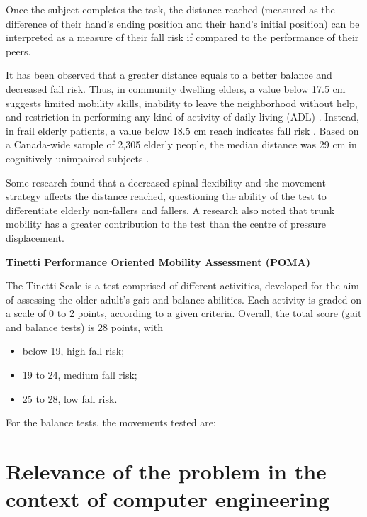 Once the subject completes the task, the distance reached (measured as the difference of their hand's ending position and their hand's initial position) can be interpreted as a measure of their fall risk if compared to the performance of their peers. 

It has been observed that a greater distance equals to a better balance and decreased fall risk. Thus, in community dwelling elders, a value below 17.5 cm suggests limited mobility skills,
inability to leave the neighborhood without help, and restriction in performing any kind of activity of daily living (ADL) \cite{FRTadl}. Instead, in frail elderly patients, a value below 18.5 cm reach indicates fall risk \cite{FRTfallrisk}. Based on a Canada-wide sample of 2,305 elderly people, the median distance was 29 cm in cognitively unimpaired subjects \cite{FRTnonfrail}.

Some research \cite{FRTreasearch1}  \cite{FRTreasearch2} found that a decreased spinal flexibility and the movement strategy affects the distance reached, questioning the ability of the test to differentiate elderly non-fallers and fallers. A research \cite{FRTtruckmobility} also noted that trunk mobility has a greater contribution to the test than the centre of pressure displacement. 

\vspace{0.3cm}
\textbf{Tinetti Performance Oriented Mobility Assessment (POMA)}

The Tinetti Scale is a test comprised of different activities, developed for the aim of assessing the older adult’s gait and 
balance abilities. Each activity is graded on a scale of 0 to 2 points, according to a given criteria. 
Overall, the total score (gait and balance tests) is 28 points, with 
\begin{itemize}
    \item below 19, high fall risk;
    \item 19 to 24, medium fall risk;
    \item 25 to 28, low fall risk.
\end{itemize}
For the balance tests, the movements tested are:





\section{Relevance of the problem in the context of computer engineering}

